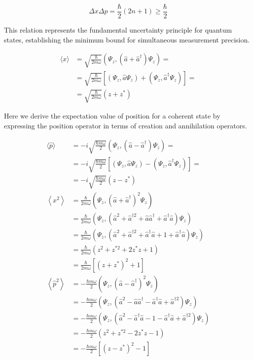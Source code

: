 \documentclass[italian]{HKNdocument}
\begin{document}
\begin{equation}
\Delta x \Delta p=\frac{\hbar}{2}(2 n+1) \geq \frac{\hbar}{2} \label{eq:7.69}
\end{equation}

This relation represents the fundamental uncertainty principle for quantum states, establishing the minimum bound for simultaneous measurement precision.

\begin{align}
\langle x\rangle & =\sqrt{\frac{\hbar}{2 m \omega}}\left(\Psi_{z},\left(\hat{a}+\hat{a}^{\dagger}\right) \Psi_{z}\right)= \\
& =\sqrt{\frac{\hbar}{2 m \omega}}\left[\left(\Psi_{z}, \hat{a} \Psi_{z}\right)+\left(\Psi_{z}, \hat{a}^{\dagger} \Psi_{z}\right)\right]=  \label{eq:7.70}\\
& =\sqrt{\frac{\hbar}{2 m \omega}}\left(z+z^{*}\right)
\end{align}

Here we derive the expectation value of position for a coherent state by expressing the position operator in terms of creation and annihilation operators.

\begin{align}
\langle\hat{p}\rangle & =-i \sqrt{\frac{\hbar m \omega}{2}}\left(\Psi_{z},\left(\hat{a}-\hat{a}^{\dagger}\right) \Psi_{z}\right)= \\
& =-i \sqrt{\frac{\hbar m \omega}{2}}\left[\left(\Psi_{z}, \hat{a} \Psi_{z}\right)-\left(\Psi_{z}, \hat{a}^{\dagger} \Psi_{z}\right)\right]=  \label{eq:7.71}\\
& =-i \sqrt{\frac{\hbar m \omega}{2}}\left(z-z^{*}\right) \\
\left\langle x^{2}\right\rangle & =\frac{\hbar}{2 m \omega}\left(\Psi_{z},\left(\hat{a}+\hat{a}^{\dagger}\right)^{2} \Psi_{z}\right) \\
& =\frac{\hbar}{2 m \omega}\left(\Psi_{z},\left(\hat{a}^{2}+\hat{a}^{\dagger 2}+\hat{a} \hat{a}^{\dagger}+\hat{a}^{\dagger} \hat{a}\right) \Psi_{z}\right) \\
& =\frac{\hbar}{2 m \omega}\left(\Psi_{z},\left(\hat{a}^{2}+\hat{a}^{\dagger 2}+\hat{a}^{\dagger} \hat{a}+1+\hat{a}^{\dagger} \hat{a}\right) \Psi_{z}\right)  \label{eq:7.72}\\
& =\frac{\hbar}{2 m \omega}\left(z^{2}+z^{* 2}+2 z^{*} z+1\right) \\
& =\frac{\hbar}{2 m \omega}\left[\left(z+z^{*}\right)^{2}+1\right] \\
\left\langle\hat{p}^{2}\right\rangle & =-\frac{\hbar m \omega}{2}\left(\Psi_{z},\left(\hat{a}-\hat{a}^{\dagger}\right)^{2} \Psi_{z}\right) \\
& =-\frac{\hbar m \omega}{2}\left(\Psi_{z},\left(\hat{a}^{2}-\hat{a} \hat{a}^{\dagger}-\hat{a}^{\dagger} \hat{a}+\hat{a}^{\dagger 2}\right) \Psi_{z}\right) \\
& =-\frac{\hbar m \omega}{2}\left(\Psi_{z},\left(\hat{a}^{2}-\hat{a}^{\dagger} \hat{a}-1-\hat{a}^{\dagger} \hat{a}+\hat{a}^{\dagger 2}\right) \Psi_{z}\right)  \label{eq:7.73}\\
& =-\frac{\hbar m \omega}{2}\left(z^{2}+z^{* 2}-2 z^{*} z-1\right) \\
& =-\frac{\hbar m \omega}{2}\left[\left(z-z^{*}\right)^{2}-1\right]
\end{align}
\end{document}
